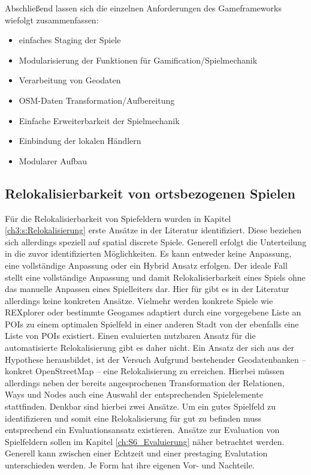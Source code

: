 Abschließend lassen sich die einzelnen Anforderungen des Gameframeworks wiefolgt zusammenfassen:

\begin{itemize}
\item einfaches Staging der Spiele
\item Modularisierung der Funktionen für Gamification/Spielmechanik
\item Verarbeitung von Geodaten
\item OSM-Daten Transformation/Aufbereitung
\item Einfache Erweiterbarkeit der Spielmechanik
\item Einbindung der lokalen Händlern
\item Modularer Aufbau
\end{itemize}


\subsection*{Relokalisierbarkeit von ortsbezogenen Spielen}

Für die Relokalisierbarkeit von Spiefeldern wurden in Kapitel \ref{ch3:s:Relokalisierung} erste Ansätze in der Literatur identifiziert. Diese beziehen sich allerdings speziell auf spatial discrete Spiele.
Generell erfolgt die Unterteilung in die zuvor identifizierten Möglichkeiten.
Es kann entweder keine Anpassung, eine vollständige Anpassung oder ein Hybrid Ansatz erfolgen. Der ideale Fall stellt eine vollständige Anpassung und damit Relokalisierbarkeit eines Spiels ohne das manuelle Anpassen eines Spielleiters dar. Hier für gibt es in der Literatur allerdings keine konkreten Ansätze. Vielmehr werden konkrete Spiele wie REXplorer \cite{Ballagas.2007} oder bestimmte Geogames \cite{Kiefer.2007} adaptiert durch eine vorgegebene Liste an POIs zu einem optimalen Spielfeld in einer anderen Stadt von der ebenfalls eine Liste von POIs existiert.
Einen evaluierten nutzbaren Ansatz für die automatisierte Relokalisierung gibt es daher nicht.
Ein Ansatz der sich aus der Hypothese herausbildet, ist der Versuch Aufgrund bestehender Geodatenbanken -- konkret OpenStreetMap -- eine Relokalisierung zu erreichen. Hierbei müssen allerdings neben der bereits angesprochenen Transformation der Relationen, Ways und Nodes auch eine Auswahl der entsprechenden Spielelemente stattfinden. Denkbar sind hierbei zwei Ansätze. Um ein \glqq gutes Spielfeld\grqq{} zu identifizieren und somit eine Relokalisierung für gut zu befinden muss entsprechend ein Evaluationsansatz existieren. Ansätze zur Evaluation von Spielfeldern sollen im Kapitel \ref{ch:S6_Evaluierung} näher betrachtet werden. Generell kann zwischen einer Echtzeit und einer prestaging Evalutation unterschieden werden. Je Form hat ihre eigenen Vor- und Nachteile.

